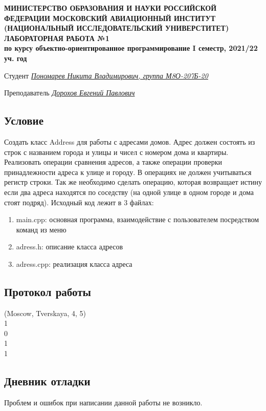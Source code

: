 \documentclass[12pt]{article}
\begin{document}
\begin{titlepage}
\begin{center}
\textbf{МИНИСТЕРСТВО ОБРАЗОВАНИЯ И НАУКИ РОССИЙСКОЙ ФЕДЕРАЦИИ
\medskip
МОСКОВСКИЙ АВИАЦИОННЫЙ ИНСТИТУТ
(НАЦИОНАЛЬНЫЙ ИССЛЕДОВАТЕЛЬСКИЙ УНИВЕРСТИТЕТ)
\vfill\vfill
{\Huge ЛАБОРАТОРНАЯ РАБОТА №1} \\
по курсу объектно-ориентированное программирование
I семестр, 2021/22 уч. год}
\end{center}
\vfill

Студент \uline{\it {Пономарев Никита Владимирович, группа М8О-207Б-20}\hfill}

Преподаватель \uline{\it {Дорохов Евгений Павлович}\hfill}

\vfill
\end{titlepage}

\subsection*{Условие}
Создать класс Address для работы с адресами домов. Адрес должен состоять из 
строк с названием города и улицы и чисел с номером дома и квартиры. Реализовать 
операции сравнения адресов, а также операции проверки принадлежности адреса к 
улице и городу. В операциях не должен учитываться регистр строки. Так же 
необходимо сделать операцию, которая возвращает истину если два адреса 
находятся по соседству (на одной улице в одном городе и дома стоят подряд).
Исходный код лежит в 3 файлах:
\begin{enumerate}
\item main.cpp: основная программа, взаимодействие с пользователем посредством команд из меню
\item adress.h:    описание класса адресов
\item adress.cpp:  реализация класса адреса

\end{enumerate}
\pagebreak
\subsection*{Протокол работы}
(Moscow, Tverskaya, 4, 5) \\
1 \\
0 \\
1 \\
1 \\
\subsection*{Дневник отладки}
Проблем и ошибок при написании данной работы не возникло.
\end{document}
